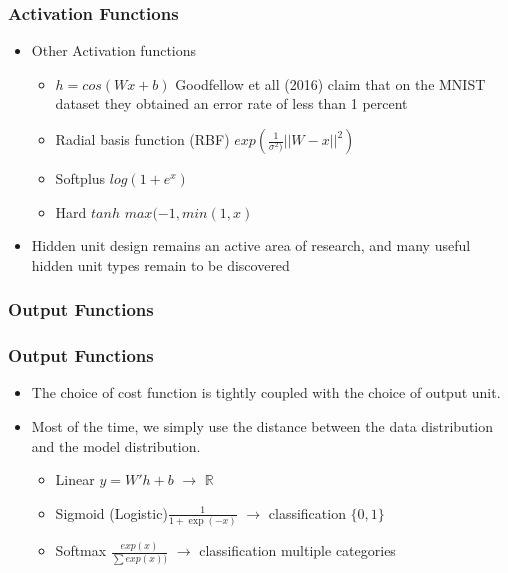\documentclass[
  shownotes,
  xcolor={svgnames},
  hyperref={colorlinks,citecolor=DarkBlue,linkcolor=DarkRed,urlcolor=DarkBlue}
  , aspectratio=169]{beamer}
\begin{document}
\begin{frame}
\frametitle{Activation Functions}


\begin{itemize}
\item Other Activation functions
\medskip
\begin{itemize}
\item $h=cos(W x+b)$ Goodfellow et all (2016) claim that on the MNIST dataset they obtained an error rate of less than 1 percent
\medskip
\item Radial basis function (RBF) $exp\left( \frac{1}{\sigma^2)}||W-x||^2 \right)$
\medskip
\item Softplus $log(1+e^x)$
\medskip
\item Hard $tanh$ $max(-1,min(1,x)$
\medskip
\end{itemize}
\item Hidden unit design remains an active area of research, and many useful hidden unit types remain to be discovered
\end{itemize}


\end{frame}
\subsubsection{Output Functions}
\begin{frame}
\frametitle{Output Functions}

\begin{itemize}
\item The choice of cost function is tightly coupled with the choice of output unit. 
\medskip
\item Most of the time, we simply use the distance between the data distribution and the model distribution. 
\medskip
\begin{itemize}

    \item Linear $y=W'h +b$ $\rightarrow$  $\mathbb{R}$
    \medskip
    \item Sigmoid (Logistic)$\frac{1}{1 + \exp(-x)}$ $\rightarrow$ classification $\{0,1\}$
    \medskip
    \item Softmax $\frac{exp(x)}{\sum exp(x))}$ $\rightarrow$ classification multiple categories
\end{itemize}
\end{itemize}

\end{frame}
\end{document}
